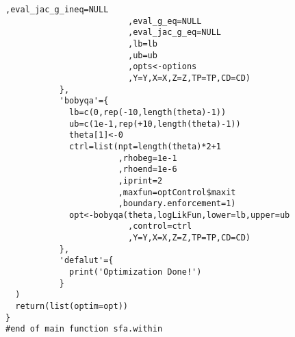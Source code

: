 \begin{lstlisting}[label=Rcode1, caption=R-Code for Maximum Likelihood Function]
                         ,eval_jac_g_ineq=NULL
                         ,eval_g_eq=NULL
                         ,eval_jac_g_eq=NULL
                         ,lb=lb
                         ,ub=ub
                         ,opts<-options
                         ,Y=Y,X=X,Z=Z,TP=TP,CD=CD)
           },         
           'bobyqa'={
             lb=c(0,rep(-10,length(theta)-1)) 
             ub=c(1e-1,rep(+10,length(theta)-1))
             theta[1]<-0
             ctrl=list(npt=length(theta)*2+1
                       ,rhobeg=1e-1
                       ,rhoend=1e-6
                       ,iprint=2
                       ,maxfun=optControl$maxit
                       ,boundary.enforcement=1)
             opt<-bobyqa(theta,logLikFun,lower=lb,upper=ub
                         ,control=ctrl
                         ,Y=Y,X=X,Z=Z,TP=TP,CD=CD)
           },
           'defalut'={
             print('Optimization Done!')
           }
  )
  return(list(optim=opt))          
}
#end of main function sfa.within

\end{lstlisting}


